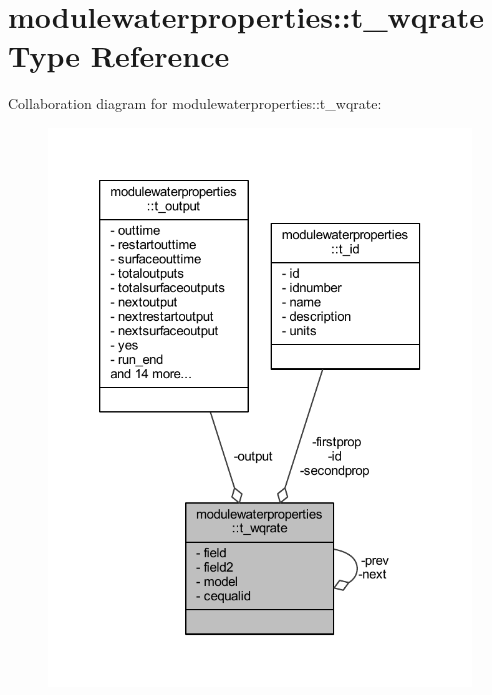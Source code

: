\hypertarget{structmodulewaterproperties_1_1t__wqrate}{}\section{modulewaterproperties\+:\+:t\+\_\+wqrate Type Reference}
\label{structmodulewaterproperties_1_1t__wqrate}


Collaboration diagram for modulewaterproperties\+:\+:t\+\_\+wqrate\+:\nopagebreak
\begin{figure}[H]
\begin{center}
\leavevmode
\includegraphics[width=326pt]{structmodulewaterproperties_1_1t__wqrate__coll__graph}
\end{center}
\end{figure}
